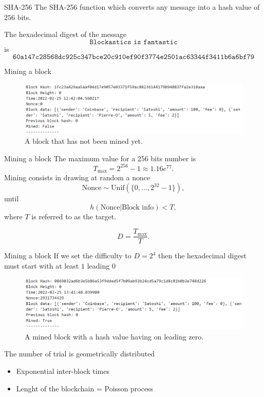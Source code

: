 \documentclass{beamer}
\begin{document}
\begin{frame}{SHA-256}
The SHA-256 function which converts any message into a hash value of $256$ bits.
\begin{tcolorbox}[enhanced,drop shadow, title=Example]
The hexadecimal digest of the message
$$
\texttt{Blockastics is fantastic}
$$
is 
\footnotesize
$$
\texttt{60a147c28568dc925c347bce20c910ef90f3774e2501ac63344f3411b6a6bf79}
$$
\end{tcolorbox}
\end{frame}
\begin{frame}{Mining a block}
\begin{figure}[!ht]
    \includegraphics[width = \textwidth]{../../../Figures/block_not_mined.png}
    \captionsetup{width=0.8\textwidth}
    \centering
    \caption{A block that has not been mined yet.}
    \label{fig:block_not_mined}
\end{figure}
\end{frame}
\begin{frame}{Mining a block}
The maximum value for a 256 bits number is
$$
T_\text{max} = 2^{256}-1 \approx 1.16e^{77}.
$$
Mining consists in drawing at random a nonce 
$$
\text{Nonce} \sim \text{Unif}(\{0,\ldots, 2^{32}-1\}),
$$
until 
$$
h(\text{Nonce}|\text{Block info})<T,
$$
where $T$ is referred to as the target.
\begin{tcolorbox}[enhanced,drop shadow, title=Difficulty of the cryptopuzzle]
$$
D = \frac{T_{\max}}{T}.
$$
\end{tcolorbox}

\end{frame}
\begin{frame}{Mining a block}
If we set the difficulty to $D = 2^4$ then the hexadecimal digest must start with at least $1$ leading $0$
\begin{figure}[!ht]
    \includegraphics[width = \textwidth]{../../../Figures/block_mined.png}
    \captionsetup{width=0.8\textwidth}
    \centering
    \caption{A mined block with a hash value having on leading zero.}
    \label{fig:block_mined}
\end{figure}
The number of trial is geometrically distributed
\begin{itemize}
\item Exponential inter-block times
\item Lenght of the blockchain = Poisson process
\end{itemize}
\end{frame}
\end{document}
